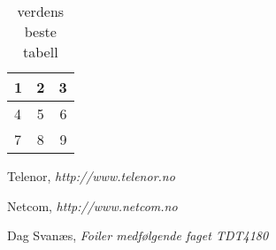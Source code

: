\documentclass[titlepage]{article}
\begin{document}



\begin{table}[H]
   \centering
   \label{tab:lulz}
   \begin{tabular}{| l | c | r |}
      \hline
      1 & 2 & 3 \\
      \hline
      4 & 5 & 6 \\
      \hline
      7 & 8 & 9 \\
      \hline
   \end{tabular}
   \caption{verdens beste tabell}
\end{table}


%

\newpage
\begin{thebibliography}{9}

	Telenor,
	\emph{http://www.telenor.no}

	Netcom,
	\emph{http://www.netcom.no}

	Dag Svanæs,
	\emph{Foiler medfølgende faget TDT4180}
\end{thebibliography}
\end{document}
